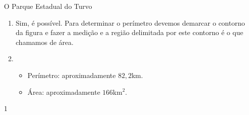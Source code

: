 \clearmargin
\begin{answer}{O Parque Estadual do Turvo}
{
  \begin{enumerate}
  \item Sim, é possível. Para determinar o perímetro devemos demarcar o contorno da figura e fazer a medição e a região delimitada por este contorno é o que chamamos de área.
  \item 
  \begin{itemize}
  \item Perímetro: aproximadamente $82{,}2$km.
  \item Área: aproximadamente $166$km$^2$.
  \end{itemize}
  
  \end{enumerate}
}{1}
\end{answer}

